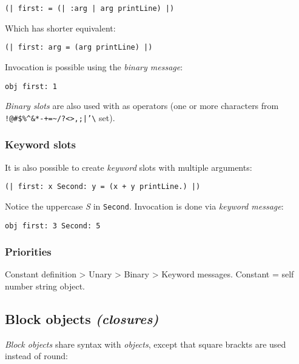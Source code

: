 \documentclass[10pt]{article}
\begin{document}
\begin{multicols*}{3}
\begin{lstlisting}
(| first: = (| :arg | arg printLine) |)
\end{lstlisting}

Which has shorter equivalent:

\begin{lstlisting}
(| first: arg = (arg printLine) |)
\end{lstlisting}

Invocation is possible using the \textit{binary message}:

\begin{lstlisting}
obj first: 1
\end{lstlisting}

\textit{Binary slots} are also used with as operators (one or more characters from \texttt{!@\#\$\%\^{}\&*-+=\textasciitilde/?\textless\textgreater,;|'\textbackslash{}} set).



\subsubsection{Keyword slots}
It is also possible to create \textit{keyword} slots with multiple arguments:

\begin{lstlisting}
(| first: x Second: y = (x + y printLine.) |)
\end{lstlisting}

Notice the uppercase \textit{S} in \texttt{Second}. Invocation is done via \textit{keyword message}:

\begin{lstlisting}
obj first: 3 Second: 5
\end{lstlisting}



\subsubsection{Priorities}

Constant definition \textgreater{} Unary \textgreater{} Binary \textgreater{} Keyword messages. Constant = self \textbar{} number \textbar{} string \textbar{} object.




\subsection{Block objects \textit{(closures)}}
\textit{Block objects} share syntax with \textit{objects}, except that square brackts are used instead of round:


\end{multicols*}
\end{document}

